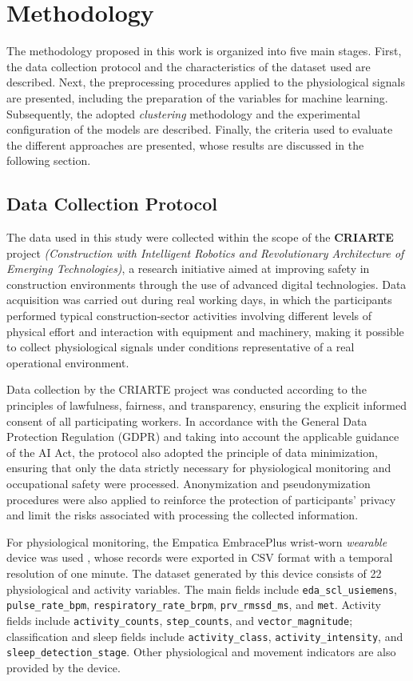 \documentclass[a4paper,fleqn]{cas-sc}
\begin{document}
\section{Methodology}\label{sec:method}

The methodology proposed in this work is organized into five main stages. First, the data collection protocol and the characteristics of the dataset used are described. Next, the preprocessing procedures applied to the physiological signals are presented, including the preparation of the variables for machine learning. Subsequently, the adopted \textit{clustering} methodology and the experimental configuration of the models are described. Finally, the criteria used to evaluate the different approaches are presented, whose results are discussed in the following section.

\subsection{Data Collection Protocol}
The data used in this study were collected within the scope of the \textbf{CRIARTE} project \textit{(Construction with Intelligent Robotics and Revolutionary Architecture of Emerging Technologies)}, a research initiative aimed at improving safety in construction environments through the use of advanced digital technologies. Data acquisition was carried out during real working days, in which the participants performed typical construction-sector activities involving different levels of physical effort and interaction with equipment and machinery, making it possible to collect physiological signals under conditions representative of a real operational environment.

Data collection by the CRIARTE project was conducted according to the principles of lawfulness, fairness, and transparency, ensuring the explicit informed consent of all participating workers. In accordance with the General Data Protection Regulation (GDPR) and taking into account the applicable guidance of the AI Act, the protocol also adopted the principle of data minimization, ensuring that only the data strictly necessary for physiological monitoring and occupational safety were processed. Anonymization and pseudonymization procedures were also applied to reinforce the protection of participants' privacy and limit the risks associated with processing the collected information.

For physiological monitoring, the Empatica EmbracePlus wrist-worn \textit{wearable} device was used \cite{empatica_embraceplus}, whose records were exported in CSV format with a temporal resolution of one minute. The dataset generated by this device consists of 22 physiological and activity variables. The main fields include \texttt{eda\_scl\_usiemens}, \texttt{pulse\_rate\_bpm}, \texttt{respiratory\_rate\_brpm}, \texttt{prv\_rmssd\_ms}, and \texttt{met}. Activity fields include \texttt{activity\_counts}, \texttt{step\_counts}, and \texttt{vector\_magnitude}; classification and sleep fields include \texttt{activity\_class}, \texttt{activity\_intensity}, and \texttt{sleep\_detection\_stage}. Other physiological and movement indicators are also provided by the device.
\end{document}
